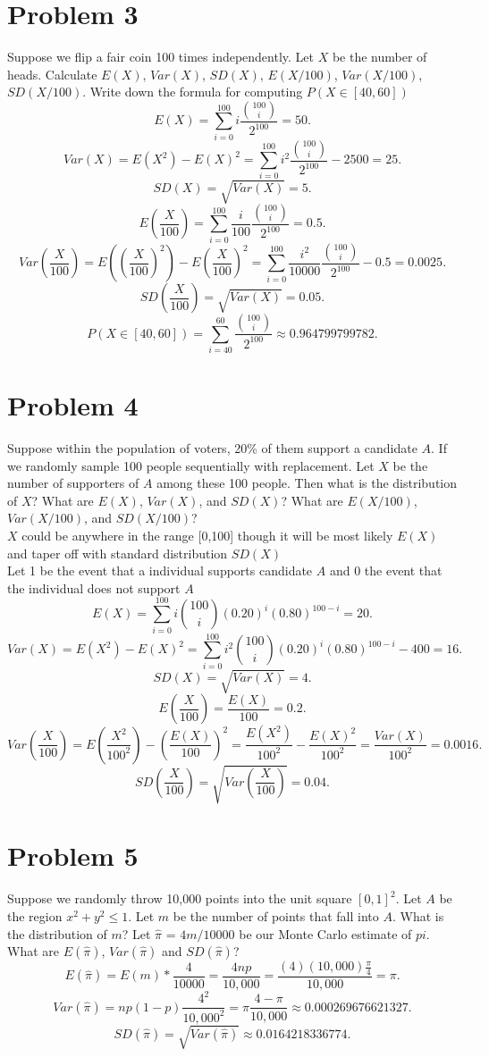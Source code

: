 \documentclass{article}
\begin{document}
    \section{Problem 3}
    Suppose we flip a fair coin 100 times independently. Let $X$ be the number of heads.
Calculate $E(X)$, $Var(X)$, $SD(X)$, $E(X/100)$, $Var(X/100)$, $SD(X/100)$. Write down the formula
for computing $P (X \in [40, 60])$
    \[
        E(X) = \sum_{i=0}^{100} i\frac{\binom{100}{i}}{2^{100}} = 50 
    .\] 
    \[
        Var(X) = E(X^2) - E(X)^2 = \sum_{i=0}^{100} i^2\frac{\binom{100}{i}}{2^{100}} - 2500 = 25
    .\] 
    \[
        SD(X) = \sqrt{Var(X)} = 5
    .\] 
    \[
        E(\frac{X}{100}) = \sum_{i=0}^{100} \frac{i}{100}\frac{\binom{100}{i}}{2^{100}} = 0.5
    .\] 
    \[
        Var(\frac{X}{100}) = E((\frac{X}{100})^2) - E(\frac{X}{100})^2 = \sum_{i=0}^{100} \frac{i^2}{10000}\frac{\binom{100}{i}}{2^{100}} - 0.5 = 0.0025
    .\] 
    \[
        SD(\frac{X}{100}) = \sqrt{Var(X)} = 0.05
    .\] 
    \[
        P(X \in [40,60]) = \sum_{i=40}^{60} \frac{\binom{100}{i}}{2^{100}} \approx 0.964799799782
    .\] 
    \section{Problem 4}
    Suppose within the population of voters, 20\% of them support a candidate $A$. If we
randomly sample 100 people sequentially with replacement. Let $X$ be the number of supporters
of $A$   among these 100 people. Then what is the distribution of $X$? What are $E(X)$, $Var(X)$, and
$SD(X)$? What are $E(X/100)$, $Var(X/100)$, and $SD(X/100)$?
\\ $X$ could be anywhere in the range [0,100] though it will be most likely $E(X)$ and taper off
with standard distribution $SD(X)$ \\ Let 1 be the event that a individual supports candidate $A$ and 0 the event that
the individual does not support $A$
 \[
     E(X) = \sum_{i=0}^{100} i \binom{100}{i}(0.20)^{i}(0.80)^{100-i} = 20
.\] 
\[
     Var(X) = E(X^2) - E(X)^2 =  \sum_{i=0}^{100} i^2 \binom{100}{i}(0.20)^{i}(0.80)^{100-i} - 400 = 16
.\] 
\[
     SD(X) = \sqrt{Var(X)} = 4
.\] 
\[
     E(\frac{X}{100}) = \frac{E(X)}{100} = 0.2
.\] 
\[
     Var(\frac{X}{100}) = E(\frac{X^2}{100^2}) - (\frac{E(X)}{100})^2 = \frac{E(X^2)}{100^2} - \frac{E(X)^2}{100^2} = \frac{Var(X)}{100^2} = 0.0016
.\] 
\[
    SD(\frac{X}{100}) = \sqrt{Var(\frac{X}{100})} = 0.04
.\] 
\section{Problem 5}
Suppose we randomly throw 10,000 points into the unit square $[0,1]^2$. Let $A$ be the
region $x^2 + y^2 \le 1$. Let $m$ be the number of points that fall into $A$. What is the distribution of $m$?
Let $\hat{\pi}$ = $4m/10000$ be our Monte Carlo estimate of $pi$. What are $E(\hat{\pi})$, $Var(\hat{\pi})$ and $SD(\hat{\pi})$?
\[
E(\hat{\pi}) = E(m)*\frac{4}{10000} = \frac{4np}{10,000} = \frac{(4)(10,000)\frac{\pi}{4}}{10,000} = \pi 
.\] 
\[
    Var(\hat{\pi}) = np(1-p)\frac{4^2}{10,000^2} = \pi\frac{4-\pi}{10,000} \approx 0.000269676621327
.\] 
\[
    SD(\hat{\pi}) = \sqrt{Var(\hat{\pi})} \approx 0.0164218336774
.\] 
       
\end{document}
